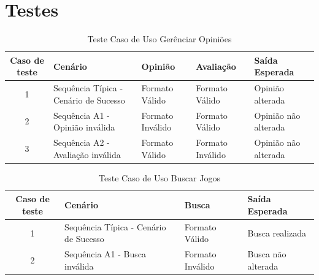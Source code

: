 \documentclass[a4paper,11pt]{article}
\begin{document}
\section{Testes}
	\begin{center}
	\begin{table}[H]
		\begin{tabularx}{\textwidth}{c|X|X|X|X}
			\textbf{Caso de teste} & \textbf{Cenário} & \textbf{Opinião} & \textbf{Avaliação} & \textbf{Saída Esperada} \\
			\hline
			1 & Sequência Típica - Cenário de Sucesso & Formato Válido & Formato Válido & Opinião alterada\\ \hline
			2 & Sequência A1 - Opinião inválida & Formato Inválido & Formato Válido & Opinião não alterada\\ \hline
			3 & Sequência A2 - Avaliação inválida & Formato Válido & Formato Inválido & Opinião não alterada\\ \hline
			
		\end{tabularx}
		\caption{Teste Caso de Uso Gerênciar Opiniões}
	\end{table}
	\end{center}
	
	\begin{center}
	\begin{table}[H]
		\begin{tabularx}{\textwidth}{c|X|X|X}
			\textbf{Caso de teste} & \textbf{Cenário} & \textbf{Busca} & \textbf{Saída Esperada} \\
			\hline
			1 & Sequência Típica - Cenário de Sucesso & Formato Válido & Busca realizada\\ \hline
			2 & Sequência A1 - Busca inválida & Formato Inválido & Busca não alterada\\ \hline
			
		\end{tabularx}
		\caption{Teste Caso de Uso Buscar Jogos}
	\end{table}
	\end{center}
	
\end{document}
